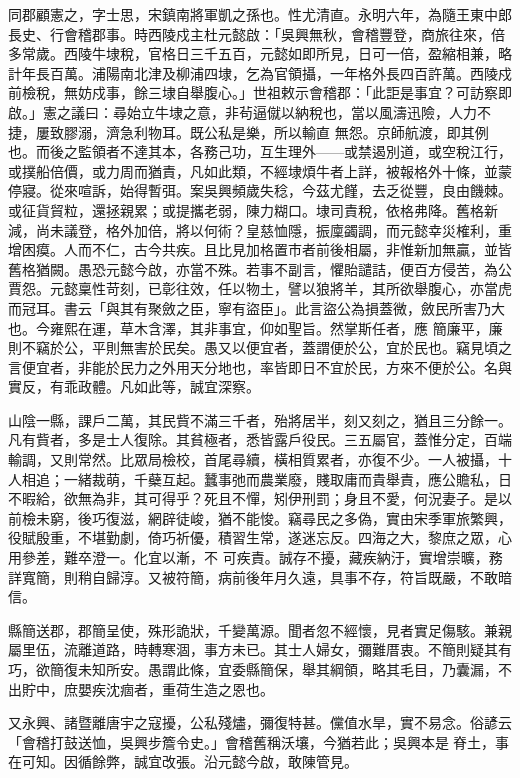 \begin{pinyinscope}
 同郡顧憲之，字士思，宋鎮南將軍凱之孫也。性尤清直。永明六年，為隨王東中郎長史、行會稽郡事。時西陵戍主杜元懿啟：「吳興無秋，會稽豐登，商旅往來，倍多常歲。西陵牛埭稅，官格日三千五百，元懿如即所見，日可一倍，盈縮相兼，略計年長百萬。浦陽南北津及柳浦四埭，乞為官領攝，一年格外長四百許萬。西陵戍前檢稅，無妨戍事，餘三埭自舉腹心。」世祖敕示會稽郡：「此詎是事宜？可訪察即啟。」憲之議曰：尋始立牛埭之意，非茍逼僦以納稅也，當以風濤迅險，人力不捷，屢致膠溺，濟急利物耳。既公私是樂，所以輸直
 無怨。京師航渡，即其例也。而後之監領者不達其本，各務己功，互生理外——或禁遏別道，或空稅江行，或撲船倍價，或力周而猶責，凡如此類，不經埭煩牛者上詳，被報格外十條，並蒙停寢。從來喧訴，始得暫弭。案吳興頻歲失稔，今茲尤饉，去乏從豐，良由饑棘。或征貨貿粒，還拯親累；或提攜老弱，陳力糊口。埭司責稅，依格弗降。舊格新減，尚未議登，格外加倍，將以何術？皇慈恤隱，振廩蠲調，而元懿幸災榷利，重增困瘼。人而不仁，古今共疾。且比見加格置市者前後相屬，非惟新加無贏，並皆舊格猶闕。愚恐元懿今啟，亦當不殊。若事不副言，懼貽譴詰，便百方侵苦，為公賈怨。元懿稟性苛刻，已彰往效，任以物土，譬以狼將羊，其所欲舉腹心，亦當虎而冠耳。書云「與其有聚斂之臣，寧有盜臣」。此言盜公為損蓋微，斂民所害乃大也。今雍熙在運，草木含澤，其非事宜，仰如聖旨。然掌斯任者，應
 簡廉平，廉則不竊於公，平則無害於民矣。愚又以便宜者，蓋謂便於公，宜於民也。竊見頃之言便宜者，非能於民力之外用天分地也，率皆即日不宜於民，方來不便於公。名與實反，有乖政體。凡如此等，誠宜深察。



 山陰一縣，課戶二萬，其民貲不滿三千者，殆將居半，刻又刻之，猶且三分餘一。凡有貲者，多是士人復除。其貧極者，悉皆露戶役民。三五屬官，蓋惟分定，百端輸調，又則常然。比眾局檢校，首尾尋續，橫相質累者，亦復不少。一人被攝，十人相追；一緒裁萌，千蘗互起。蠶事弛而農業廢，賤取庸而貴舉責，應公贍私，日不暇給，欲無為非，其可得乎？死且不憚，矧伊刑罰；身且不愛，何況妻子。是以前檢未窮，後巧復滋，網辟徒峻，猶不能悛。竊尋民之多偽，實由宋季軍旅繁興，役賦殷重，不堪勤劇，倚巧祈優，積習生常，遂迷忘反。四海之大，黎庶之眾，心用參差，難卒澄一。化宜以漸，不
 可疾責。誠存不擾，藏疾納汙，實增崇曠，務詳寬簡，則稍自歸淳。又被符簡，病前後年月久遠，具事不存，符旨既嚴，不敢暗信。



 縣簡送郡，郡簡呈使，殊形詭狀，千變萬源。聞者忽不經懷，見者實足傷駭。兼親屬里伍，流離道路，時轉寒涸，事方未已。其士人婦女，彌難厝衷。不簡則疑其有巧，欲簡復未知所安。愚謂此條，宜委縣簡保，舉其綱領，略其毛目，乃囊漏，不出貯中，庶嬰疾沈痼者，重荷生造之恩也。



 又永興、諸暨離唐宇之寇擾，公私殘燼，彌復特甚。儻值水旱，實不易念。俗諺云「會稽打鼓送恤，吳興步簷令史。」會稽舊稱沃壤，今猶若此；吳興本是脊土，事在可知。因循餘弊，誠宜改張。沿元懿今啟，敢陳管見。




\end{pinyinscope}
